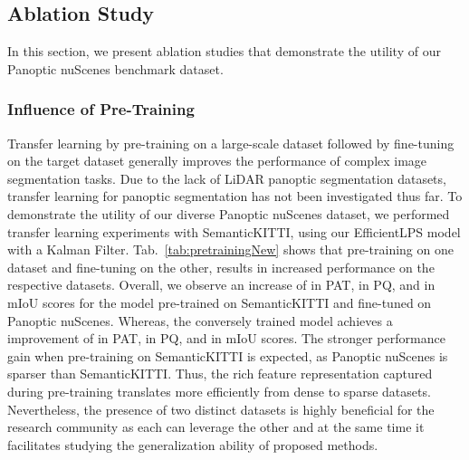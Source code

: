 \documentclass[letterpaper, 10 pt, journal, twoside]{IEEEtran}
\newcommand{\tabref}[1]{Tab.~\ref{#1}}
\begin{document}
\subsection{Ablation Study}
\label{subsec:ablation}

In this section, we present ablation studies that demonstrate the utility of our Panoptic nuScenes benchmark dataset.

\subsubsection{Influence of Pre-Training}
Transfer learning by pre-training on a large-scale dataset followed by fine-tuning on the target dataset generally improves the performance of complex image segmentation tasks. Due to the lack of LiDAR panoptic segmentation datasets, transfer learning for panoptic segmentation has not been investigated thus far. To demonstrate the utility of our diverse Panoptic nuScenes dataset, we performed transfer learning experiments with SemanticKITTI, using our EfficientLPS model with a Kalman Filter.
\tabref{tab:pretrainingNew} shows that pre-training on one dataset and fine-tuning on the other, results in increased performance on the respective datasets. Overall, we observe an increase of  in PAT,  in PQ, and  in mIoU scores for the model pre-trained on SemanticKITTI and fine-tuned on Panoptic nuScenes. Whereas, the conversely trained model achieves a improvement of  in PAT,  in PQ, and  in mIoU scores. The stronger performance gain when pre-training on SemanticKITTI is expected, as Panoptic nuScenes is sparser than SemanticKITTI. Thus, the rich feature representation captured during pre-training translates more efficiently from dense to sparse datasets. Nevertheless, the presence of two distinct datasets is highly beneficial for the research community as each can leverage the other and at the same time it facilitates studying the generalization ability of proposed methods.
\end{document}

